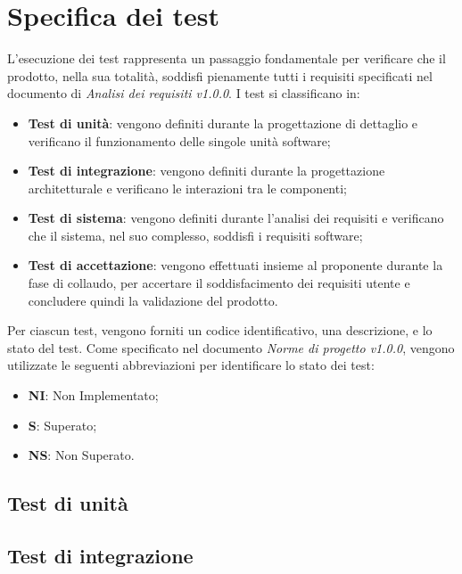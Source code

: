 \section{Specifica dei test}
L'esecuzione dei test rappresenta un passaggio fondamentale per verificare che 
il prodotto, nella sua totalità, soddisfi pienamente tutti i requisiti specificati
nel documento di \textit{Analisi dei requisiti v1.0.0}.
I test si classificano in:
\begin{itemize}
    \item \textbf{Test di unità}: vengono definiti durante la progettazione di
    dettaglio e verificano il funzionamento delle singole unità software;
    \item \textbf{Test di integrazione}: vengono definiti durante la progettazione
    architetturale e verificano le interazioni tra le componenti;
    \item \textbf{Test di sistema}: vengono definiti durante l'analisi dei requisiti
    e verificano che il sistema, nel suo complesso, soddisfi i requisiti software;
    \item \textbf{Test di accettazione}: vengono effettuati insieme al proponente 
    durante la fase di collaudo, per accertare il soddisfacimento dei requisiti utente
    e concludere quindi la validazione del prodotto.
\end{itemize}
Per ciascun test, vengono forniti un codice identificativo, una descrizione, e
lo stato del test. 
Come specificato nel documento \textit{Norme di progetto v1.0.0}, vengono utilizzate le seguenti 
abbreviazioni per identificare lo stato dei test:
\begin{itemize}
    \item \textbf{NI}: Non Implementato;
    \item \textbf{S}: Superato;
    \item \textbf{NS}: Non Superato.
\end{itemize}


\subsection{Test di unità}
\subsection{Test di integrazione}
